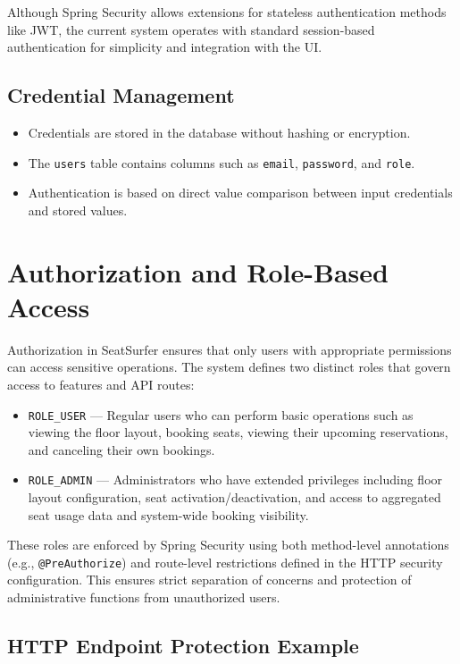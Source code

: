 \documentclass[12pt,a4paper]{report}
\begin{document}
Although Spring Security allows extensions for stateless authentication methods like JWT, the current system operates with standard session-based authentication for simplicity and integration with the UI.

\subsection*{Credential Management}

\begin{itemize}
    \item Credentials are stored in the database without hashing or encryption.
    \item The \verb|users| table contains columns such as \verb|email|, \verb|password|, and \verb|role|.
    \item Authentication is based on direct value comparison between input credentials and stored values.
\end{itemize}

\section{Authorization and Role-Based Access}

Authorization in SeatSurfer ensures that only users with appropriate permissions can access sensitive operations. The system defines two distinct roles that govern access to features and API routes:

\begin{itemize}
    \item \verb|ROLE_USER| — Regular users who can perform basic operations such as viewing the floor layout, booking seats, viewing their upcoming reservations, and canceling their own bookings.
    \item \verb|ROLE_ADMIN| — Administrators who have extended privileges including floor layout configuration, seat activation/deactivation, and access to aggregated seat usage data and system-wide booking visibility.
\end{itemize}

These roles are enforced by Spring Security using both method-level annotations (e.g., \verb|@PreAuthorize|) and route-level restrictions defined in the HTTP security configuration. This ensures strict separation of concerns and protection of administrative functions from unauthorized users.

\subsection*{HTTP Endpoint Protection Example}
\end{document}
